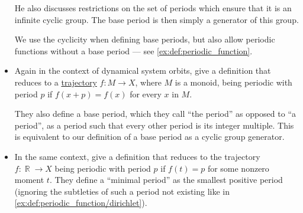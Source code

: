 \begin{remark}
\begin{itemize}
    He also discusses restrictions on the set of periods which ensure that it is an infinite cyclic group. The base period is then simply a generator of this group.

    We use the cyclicity when defining base periods, but also allow periodic functions without a base period --- see \cref{ex:def:periodic_function}.

    \item Again in the context of dynamical system orbits,  give a definition that reduces to a \hyperref[def:dynamical_system_trajectory]{trajectory} \( f: M \to X \), where \( M \) is a monoid, being periodic with period \( p \) if \( f(x + p) = f(x) \) for every \( x \) in \( M \).

    They also define a base period, which they call \enquote{the period} as opposed to \enquote{a period}, as a period such that every other period is its integer multiple. This is equivalent to our definition of a base period as a cyclic group generator.

    \item In the same context,  give a definition that reduces to the trajectory \( f: \BbbR \to X \) being periodic with period \( p \) if \( f(t) = p \) for some nonzero moment \( t \). They define a \enquote{minimal period} as the smallest positive period (ignoring the subtleties of such a period not existing like in \cref{ex:def:periodic_function/dirichlet}).
  \end{itemize}
\end{remark}

